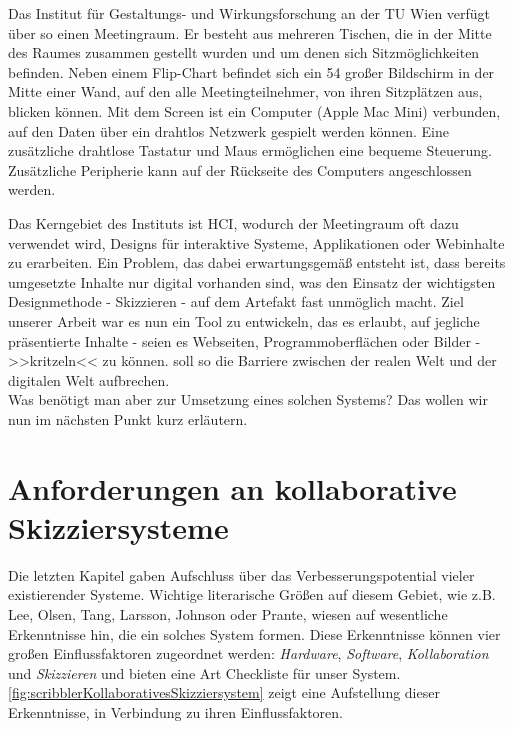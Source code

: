 \medskip Das Institut für Gestaltungs- und Wirkungsforschung an der TU Wien verfügt über so einen Meetingraum. Er besteht aus mehreren Tischen, die in der Mitte des Raumes zusammen gestellt wurden und um denen sich Sitzmöglichkeiten befinden. Neben einem Flip-Chart befindet sich ein {54\dq} großer Bildschirm in der Mitte einer Wand, auf den alle Meetingteilnehmer, von ihren Sitzplätzen aus, blicken können. Mit dem Screen ist ein Computer (Apple Mac Mini) verbunden, auf den Daten über ein drahtlos Netzwerk gespielt werden können. Eine zusätzliche drahtlose Tastatur und Maus ermöglichen eine bequeme Steuerung. Zusätzliche Peripherie kann auf der Rückseite des Computers angeschlossen werden.

\medskip Das Kerngebiet des Instituts ist \ac{HCI}, wodurch der Meetingraum oft dazu verwendet wird, Designs für interaktive Systeme, Applikationen oder Webinhalte zu erarbeiten. Ein Problem, das dabei erwartungsgemäß entsteht ist, dass bereits umgesetzte Inhalte nur digital vorhanden sind, was den Einsatz der wichtigsten Designmethode - Skizzieren - auf dem Artefakt fast unmöglich macht. Ziel unserer Arbeit war es nun ein Tool zu entwickeln, das es erlaubt, auf jegliche präsentierte Inhalte - seien es Webseiten, Programmoberflächen oder Bilder - >>kritzeln<< zu können. \scribbler soll so die Barriere zwischen der realen Welt und der digitalen Welt aufbrechen. \\Was benötigt man aber zur Umsetzung eines solchen Systems? Das wollen wir nun im nächsten Punkt kurz erläutern.

\section{Anforderungen an kollaborative Skizziersysteme} \label{sec:anforderungen}
Die letzten Kapitel gaben Aufschluss über das Verbesserungspotential vieler existierender Systeme. Wichtige literarische Größen auf diesem Gebiet, wie z.B. Lee, Olsen, Tang, Larsson, Johnson oder Prante, wiesen auf wesentliche Erkenntnisse hin, die ein solches System formen. Diese Erkenntnisse können vier großen Einflussfaktoren zugeordnet werden: \emph{Hardware}, \emph{Software}, \emph{Kollaboration} und \emph{Skizzieren} und bieten eine Art Checkliste für unser System. \autoref{fig:scribblerKollaborativesSkizziersystem} zeigt eine Aufstellung dieser Erkenntnisse, in Verbindung zu ihren Einflussfaktoren. 

